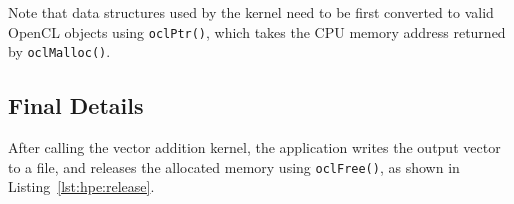 Note that data structures used by the kernel need to be first converted to valid OpenCL objects 
using \texttt{oclPtr()}, which takes the CPU memory address returned by \texttt{oclMalloc()}.

\subsection{Final Details}
After calling the vector addition kernel, the application writes the output vector to a file, and 
releases the allocated memory using \texttt{oclFree()}, as shown in Listing~\ref{lst:hpe:release}.





